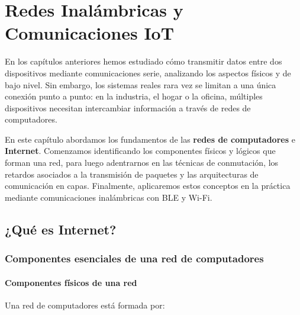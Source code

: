 
\chapter{Redes Inalámbricas y Comunicaciones IoT}

En los capítulos anteriores hemos estudiado cómo transmitir datos entre dos dispositivos mediante comunicaciones serie, analizando los aspectos físicos y de bajo nivel. Sin embargo, los sistemas reales rara vez se limitan a una única conexión punto a punto: en la industria, el hogar o la oficina, múltiples dispositivos necesitan intercambiar información a través de redes de computadores.

En este capítulo abordamos los fundamentos de las \textbf{redes de computadores} e \textbf{Internet}. Comenzamos identificando los componentes físicos y lógicos que forman una red, para luego adentrarnos en las técnicas de conmutación, los retardos asociados a la transmisión de paquetes y las arquitecturas de comunicación en capas. Finalmente, aplicaremos estos conceptos en la práctica mediante comunicaciones inalámbricas con BLE y Wi-Fi.


\section{¿Qué es Internet?}

\subsection{Componentes esenciales de una red de computadores}

\subsubsection{Componentes físicos de una red}

Una red de computadores está formada por:

